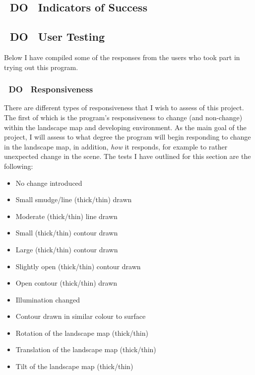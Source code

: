 \documentclass[11pt]{article}
\begin{document}
\subsection{~DO~ Indicators of Success}


\subsection{~DO~ User Testing}

Below I have compiled some of the responses from the users who took part in
trying out this program.

\subsubsection{~DO~ Responsiveness}
There are different types of responsiveness that I wish to assess of this 
project. The first of which is the program's responsiveness to change (and
non-change) within the landscape map and developing environment. As the
main goal of the project, I will assess to what degree the program will
begin responding to change in the landscape map, in addition, 
\textit{how} it responds, for example to rather unexpected change in the
scene. The tests I have outlined for this section are the following:
\begin{itemize}
	\item No change introduced
	\item Small smudge/line (thick/thin) drawn
	\item Moderate (thick/thin) line drawn 
	\item Small (thick/thin) contour drawn
	\item Large (thick/thin) contour drawn
	\item Slightly open (thick/thin) contour drawn
	\item Open contour (thick/thin) drawn
	\item Illumination changed
	\item Contour drawn in similar colour to surface
	\item Rotation of the landscape map (thick/thin) 
	\item Translation of the landscape map (thick/thin) 
	\item Tilt of the landscape map (thick/thin) 
\end{itemize}
\end{document}
